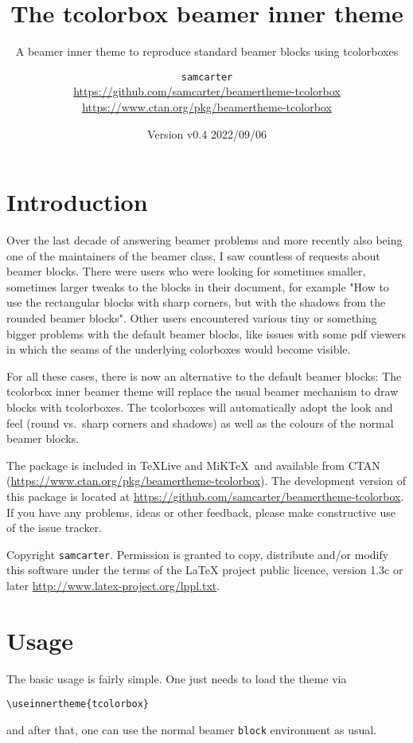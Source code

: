 \documentclass[parskip=half]{scrartcl}
\title{The tcolorbox beamer inner theme}
\subtitle{A beamer inner theme to reproduce standard beamer blocks using tcolorboxes}
\author{%
	\texorpdfstring{
		\texttt{samcarter}\\
		\url{https://github.com/samcarter/beamertheme-tcolorbox}\\
		\url{https://www.ctan.org/pkg/beamertheme-tcolorbox}
	}{samcarter}}
\date{Version v0.4 \textendash{} 2022/09/06}
\begin{document}
\maketitle

\section{Introduction}
\label{intro}

Over the last decade of answering beamer problems and more recently also being one of the maintainers of the beamer class, I saw countless of requests about beamer blocks. There were users who were looking for sometimes smaller, sometimes larger tweaks to the blocks in their document, for example "How to use the rectangular blocks with sharp corners, but with the shadows from the rounded beamer blocks". Other users encountered various tiny or something bigger problems with the default beamer blocks, like issues with some pdf viewers in which the seams of the underlying colorboxes would become visible. 

For all these cases, there is now an alternative to the default beamer blocks: The tcolorbox inner beamer theme will replace the usual beamer mechanism to draw blocks with tcolorboxes. The tcolorboxes will automatically adopt the look and feel (round vs.\ sharp corners and shadows) as well as the colours of the normal beamer blocks.

The package is included in \TeX{}Live and MiK\TeX\ and available from \textsc{CTAN} (\url{https://www.ctan.org/pkg/beamertheme-tcolorbox}). 
The development version of this package is located at \url{https://github.com/samcarter/beamertheme-tcolorbox}. If you have any problems, ideas or other feedback, please make constructive use of the issue tracker.

Copyright  \texttt{samcarter}. Permission is granted to copy, distribute and\slash or modify this software under the terms of the LaTeX project public licence, version 1.3c or later \url{http://www.latex-project.org/lppl.txt}.

\section{Usage}

The basic usage is fairly simple. One just needs to load the theme via 
\begin{tcolorbox}[title={}]
\begin{lstlisting}
\useinnertheme{tcolorbox}
\end{lstlisting}
\end{tcolorbox}
and after that, one can use the normal beamer \lstinline|block| environment as usual. 
\end{document}
